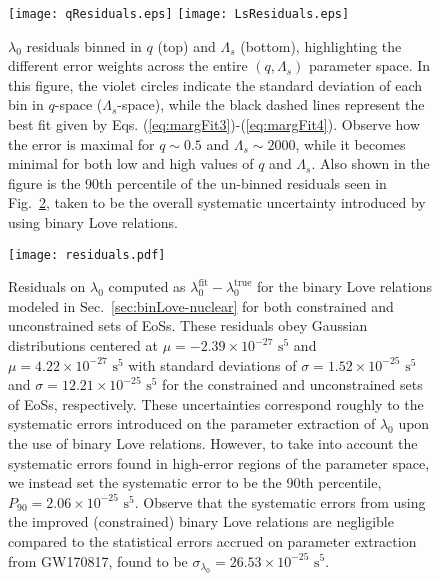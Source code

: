 \documentclass[prd,twocolumn,nofootinbib,superscriptaddress,amsmath,amssymb]{revtex4-1}
\begin{document}
\begin{figure}
\begin{center} 
\texttt{[image: qResiduals.eps]}
\texttt{[image: LsResiduals.eps]}
\end{center}
\caption{$\lambda_0$ residuals binned in $q$ (top) and $\Lambda_s$ (bottom), highlighting the different error weights across the entire $(q,\Lambda_s)$ parameter space.
In this figure, the violet circles indicate the standard deviation of each bin in $q$-space ($\Lambda_s$-space), while the black dashed lines represent the best fit given by Eqs. (\ref{eq:margFit3})-(\ref{eq:margFit4}).
Observe how the error is maximal for $q\sim0.5$ and $\Lambda_s\sim2000$, while it becomes minimal for both low and high values of $q$ and $\Lambda_s$.
Also shown in the figure is the 90th percentile of the un-binned residuals seen in Fig.~\ref{fig:residuals}, taken to be the overall systematic uncertainty introduced by using binary Love relations.
}
\label{fig:qLsResiduals}
\end{figure}

\begin{figure}
\begin{center} 
\texttt{[image: residuals.pdf]}
\end{center}
\caption{
Residuals on $\lambda_0$ computed as $\lambda_0^{\text{fit}}-\lambda_0^{\text{true}}$ for the binary Love relations modeled in Sec.~\ref{sec:binLove-nuclear} for both constrained and unconstrained sets of EoSs.
These residuals obey Gaussian distributions centered at $\mu=-2.39 \times 10^{-27} \text{ s}^5$ and $\mu=4.22 \times 10^{-27} \text{ s}^5$ with standard deviations of $\sigma=1.52\times10^{-25} \text{ s}^5$ and $\sigma=12.21\times10^{-25} \text{ s}^5$ for the constrained and unconstrained sets of EoSs, respectively.
These uncertainties correspond roughly to the systematic errors introduced on the parameter extraction of $\lambda_0$ upon the use of binary Love relations.
However, to take into account the systematic errors found in high-error regions of the parameter space, we instead set the systematic error to be the 90th percentile, $P_{90}=2.06\times10^{-25} \text{ s}^5$.
Observe that the systematic errors from using the improved (constrained) binary Love relations are negligible compared to the statistical errors accrued on parameter extraction from GW170817, found to be $\sigma_{\lambda_0}=26.53 \times 10^{-25} \text{ s}^5$.
}
\label{fig:residuals}
\end{figure}
\end{document}
